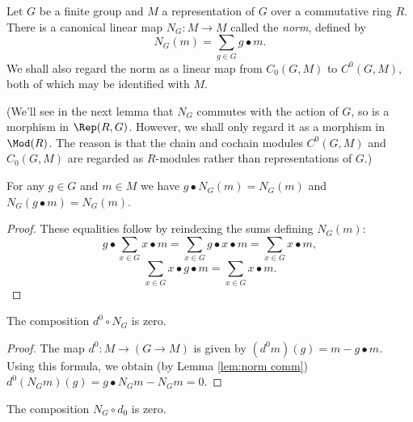 \begin{definition} \label{def:norm}
	\leanok
	\mathlibok
	Let $G$ be a finite group and $M$ a representation of $G$ over a commutative ring $R$.
	There is a canonical linear map $N_G : M \to M$ called the \emph{norm},
	defined by
	\[
		N_G(m) = \sum_{g \in G} g \bullet m.
	\]
	We shall also regard the norm as a linear map from $C_0(G,M)$ to $C^0(G,M)$, both of which may
	be identified with $M$.

	(We'll see in the next lemma that $N_G$ commutes with the action of $G$,
	so is a morphism in $\Rep(R,G)$. However, we shall only regard it as a morphism in $\Mod(R)$.
	The reason is that the chain and cochain modules $C^0(G,M)$ and
	$C_0(G,M)$ are regarded as $R$-modules rather than representations of $G$.)
\end{definition}

\begin{lemma}	\label{lem:norm comm}
	\leanok
	For any $g \in G$ and $m \in M$ we have $g \bullet N_G (m) = N_G (m)$
	and $N_G (g \bullet m) = N_G (m)$.
\end{lemma}

\begin{proof}
	\leanok
	These equalities follow by reindexing the sums defining $N_G (m)$:
	\[
		g \bullet \sum_{x \in G} x \bullet m
		= \sum_{x \in G} g \bullet x \bullet m
		= \sum_{x \in G} x \bullet m,
	\]
	\[
		\sum_{x \in G} x \bullet g \bullet m
		= \sum_{x \in G} x \bullet m.
	\]
\end{proof}

\begin{lemma}	\label{lem:norm comp d}
	\leanok
	\mathlibok
	The composition $d^0 \circ N_G$ is zero.
\end{lemma}

\begin{proof}
	\leanok
	The map $d^0 : M \to (G \to M)$ is given by
	$(d^0 m)(g) = m - g\bullet m$.
	Using this formula, we obtain (by Lemma \ref{lem:norm comm})
	$d^0 (N_G m) (g) = g \bullet N_G m - N_G m = 0$.
\end{proof}

\begin{lemma}	\label{lem:d comp norm}
	\leanok
	\mathlibok
	The composition $N_G \circ d_0$ is zero.
\end{lemma}

